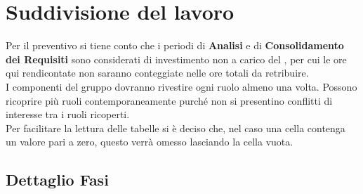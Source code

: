 \section{Suddivisione del lavoro}
Per il preventivo si tiene conto che i periodi di \textbf{Analisi} e di \textbf{Consolidamento dei Requisiti} sono considerati di investimento non a carico del , per cui le ore qui rendicontate non saranno conteggiate nelle ore totali da retribuire. \\
I componenti del gruppo dovranno rivestire ogni ruolo almeno una volta. Possono ricoprire più ruoli contemporaneamente purché non si presentino conflitti di interesse tra i ruoli ricoperti. \\
Per facilitare la lettura delle tabelle si è deciso che, nel caso una cella contenga un valore pari a zero, questo verrà omesso lasciando la cella vuota.
	\subsection{Dettaglio Fasi}
